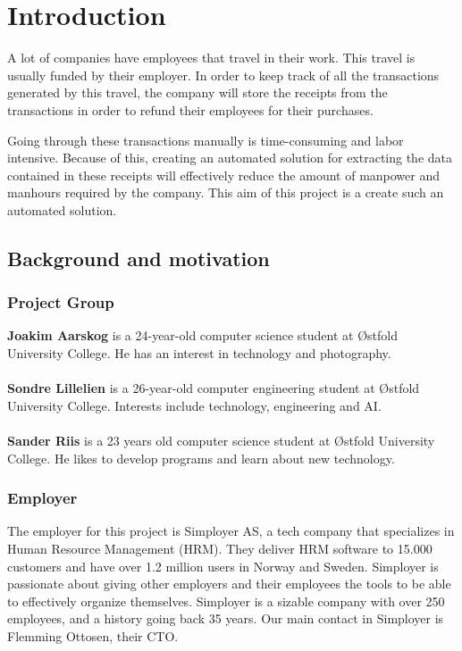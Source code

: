 \chapter{Introduction}
\label{ch:intro}
A lot of companies have employees that travel in their work.
This travel is usually funded by their employer.
In order to keep track of all the transactions generated by this travel, the company will store the receipts from the transactions in order to refund their employees for their purchases.

Going through these transactions manually is time-consuming and labor intensive.
Because of this, creating an automated solution for extracting the data contained in these receipts will effectively reduce the amount of manpower and manhours required by the company.
This aim of this project is a create such an automated solution.

\section{Background and motivation}\label{sec:background-and-motivation}
\subsection{Project Group}\label{subsec:project-group}
\textbf{Joakim Aarskog} is a 24-year-old computer science student at Østfold University College.
He has an interest in technology and photography.\\
\\
\textbf{Sondre Lillelien} is a 26-year-old computer engineering student at Østfold University College.
Interests include technology, engineering and AI.\\
\\
\textbf{Sander Riis} is a 23 years old computer science student at Østfold University College.
He likes to develop programs and learn about new technology.

\subsection{Employer}\label{subsec:employer}
The employer for this project is Simployer AS, a tech company that specializes in Human Resource Management (HRM).
They deliver HRM software to 15.000 customers and have over 1.2 million users in Norway and Sweden.
Simployer is passionate about giving other employers and their employees the tools to be able to effectively organize themselves.
Simployer is a sizable company with over 250 employees, and a history going back 35 years.
Our main contact in Simployer is Flemming Ottosen, their CTO.

